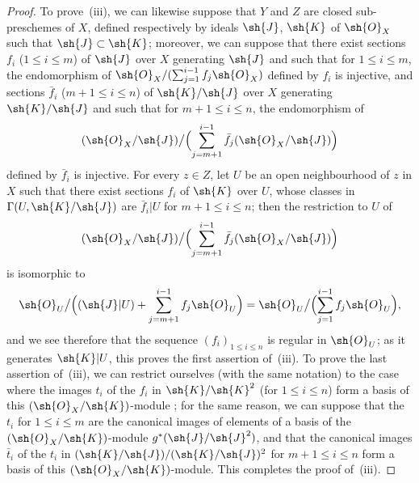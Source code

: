 \begin{proof}
To prove~(iii), we can likewise suppose that $Y$ and $Z$ are closed sub-preschemes of $X$, defined respectively by ideals $\sh{J}$, $\sh{K}$ of $\sh{O}_X$ such that $\sh{J}\subset\sh{K}$; moreover, we can suppose that there exist sections $f_i$ ($1\leq i\leq m$) of $\sh{J}$ over $X$ generating $\sh{J}$ and such that for $1\leq i\leq m$, the endomorphism of $\sh{O}_X/(\sum_{j=1}^{i-1}f_j\sh{O}_X)$ defined by $f_i$ is injective, and sections $\bar{f}_i$ ($m+1\leq i\leq n$) of $\sh{K}/\sh{J}$ over $X$ generating $\sh{K}/\sh{J}$ and such that for $m+1\leq i\leq n$, the endomorphism of
\[
  (\sh{O}_X/\sh{J})\big/\Bigl(\sum_{j=m+1}^{i-1}\bar{f}_j(\sh{O}_X/\sh{J})\Bigr)
\]
defined by $\bar{f}_i$ is injective.
For every $z\in Z$, let $U$ be an open neighbourhood of $z$ in $X$ such that there exist sections $f_i$ of $\sh{K}$ over $U$, whose classes in $\Gamma(U,\sh{K}/\sh{J})$ are $\bar{f}_i|U$ for $m+1\leq i\leq n$; then the restriction to $U$ of
\[
  (\sh{O}_X/\sh{J})\big/\Bigl(\sum_{j=m+1}^{i-1}\bar{f}_j(\sh{O}_X/\sh{J})\Bigr)
\]
is isomorphic to
\[
  \sh{O}_U\big/\Bigl((\sh{J}|U)+\sum_{j=m+1}^{i-1}f_j\sh{O}_U\Bigr)
  =\sh{O}_U\big/\Bigl(\sum_{j=1}^{i-1}f_j\sh{O}_U\Bigr),
\]
and we see therefore that the sequence $(f_i)_{1\leq i\leq n}$ is regular in $\sh{O}_U$; as it generates $\sh{K}|U$, this proves the first assertion of~(iii).
To prove the last assertion of~(iii), we can restrict ourselves (with the same notation) to the case where the images $t_i$ of the $f_i$ in $\sh{K}/\sh{K}^2$ (for $1\leq i\leq n$) form a basis of this $(\sh{O}_X/\sh{K})$-module ; for the same reason, we can suppose that the $t_i$ for $1\leq i\leq m$ are the canonical images of elements of a basis of the $(\sh{O}_X/\sh{K})$-module $g^*(\sh{J}/\sh{J}^2)$, and that the canonical images $\bar{t}_i$ of the $t_i$ in $(\sh{K}/\sh{J})/(\sh{K}/\sh{J})^2$ for $m+1\leq i\leq n$ form a basis of this $(\sh{O}_X/\sh{K})$-module.
This completes the proof of~(iii).


\end{proof}
